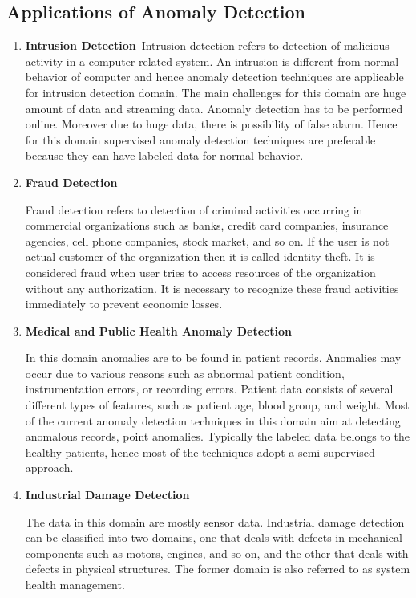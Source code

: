\subsection{Applications of Anomaly Detection}


\begin{enumerate}
	
\item \textbf{Intrusion Detection}\
Intrusion detection refers to detection of malicious activity in a computer related system. An intrusion is different from normal behavior of computer and hence anomaly detection techniques are applicable for intrusion detection domain. The main challenges for this domain are huge amount of data and streaming data. Anomaly detection has to be performed online. Moreover due to huge data, there is possibility of false alarm. Hence for this domain supervised anomaly detection techniques are preferable because they can have labeled data for normal behavior. 
	 

\item \textbf{Fraud Detection}\

Fraud detection refers to detection of criminal activities occurring in commercial organizations
such as banks, credit card companies, insurance agencies, cell phone companies,
stock market, and so on. If the user is not actual customer of the organization then it is called identity theft. It is considered fraud when user tries to access resources of the organization without any authorization. It is necessary to recognize these fraud activities immediately to prevent economic losses.


\item \textbf{Medical and Public Health Anomaly Detection}\

In this domain anomalies are to be found in patient records. Anomalies may occur due to various reasons such as abnormal
patient condition, instrumentation errors, or recording errors. Patient data consists of several different types of features,
such as patient age, blood group, and weight. Most of the current anomaly detection techniques in this
domain aim at detecting anomalous records, point anomalies. Typically the labeled
data belongs to the healthy patients, hence most of the techniques adopt a semi supervised
approach. 


\item \textbf{Industrial Damage Detection}\

The data in this domain are mostly sensor data. Industrial damage detection
can be classified into two domains, one that deals with defects in mechanical
components such as motors, engines, and so on, and the other that deals with defects
in physical structures. The former domain is also referred to as system health
management.



\end{enumerate}
